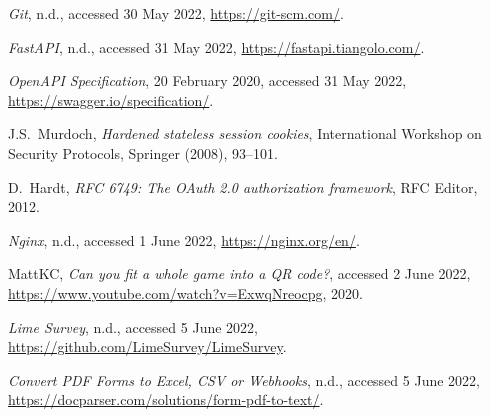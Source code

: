 \documentclass[11pt, a4paper]{report}
\begin{document}
\begin{thebibliography}{99}
\emph{Git}, n.d., accessed 30 May 2022,
\url{https://git-scm.com/}.

\emph{FastAPI}, n.d., accessed 31 May 2022,
\url{https://fastapi.tiangolo.com/}.

\emph{OpenAPI Specification}, 20 February 2020, accessed 31 May 2022,
\url{https://swagger.io/specification/}.

J.S.~Murdoch,
\emph{Hardened stateless session cookies},
International Workshop on Security Protocols, Springer (2008),  93--101.

D.~Hardt,
\emph{RFC 6749: The OAuth 2.0 authorization framework}, RFC Editor, 2012.

\emph{Nginx}, n.d., accessed 1 June 2022, 
\url{https://nginx.org/en/}.

MattKC, \emph{Can you fit a whole game into a QR code?}, accessed 2 June 2022, \url{https://www.youtube.com/watch?v=ExwqNreocpg}, 2020.

\emph{Lime Survey}, n.d., accessed 5 June 2022,
\url{https://github.com/LimeSurvey/LimeSurvey}.

\emph{Convert PDF Forms to Excel, CSV or Webhooks}, n.d., accessed 5 June 2022,
\url{https://docparser.com/solutions/form-pdf-to-text/}.

\end{thebibliography}
\end{document}
